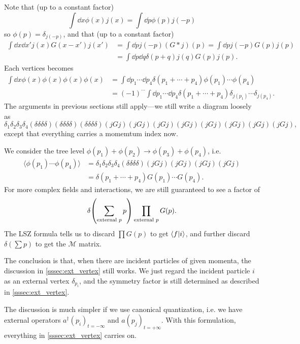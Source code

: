 \documentclass{article}
\begin{document}
Note that (up to a constant factor)
\[ \int \dd{x} \phi(x) j(x) = \int \dd{p} \phi(p) j(-p) \]
so $\phi(p) = \delta_{j(-p)}$, and that (up to a constant factor)
\begin{align*}
    \int \dd{x} \dd{x'} j(x) G(x-x') j(x') &= \int \dd{p} j(-p) (G*j)(p) = \int \dd{p} j(-p) G(p) j(p) \\
    &= \int \dd{p} \dd{q} \delta(p+q) j(q) G(p) j(p).
\end{align*}
Each vertices becomes
\begin{align*}
    \int \dd{x} \phi(x) \phi(x) \phi(x) \phi(x) &= \int \dd{p_1} \cdots \dd{p_4} \delta(p_1 + \cdots + p_4) \phi(p_1) \cdots \phi(p_4) \\
    &= (-1)^{\cdots} \int \dd{p_1} \cdots \dd{p_4} \delta(p_1 + \cdots + p_4) \delta_{j(p_1)} \cdots \delta_{j(p_4)}.
\end{align*}
The arguments in previous sections still apply---we still write a diagram loosely as
\[ \delta_1\delta_2\delta_3\delta_4(\delta\delta\delta\delta)(\delta\delta\delta\delta)(\delta\delta\delta\delta)(jGj)(jGj)(jGj)(jGj)(jGj)(jGj)(jGj)(jGj), \]
except that everything carries a momemtum index now.
\par
We consider the tree level $\phi(p_1)+\phi(p_2) \rightarrow \phi(p_3)+\phi(p_4)$, i.e.
\begin{align*}
    \langle \phi(p_1) \cdots \phi(p_4) \rangle &= \delta_1\delta_2\delta_3\delta_4(\delta\delta\delta\delta)(jGj)(jGj)(jGj)(jGj) \\
    &= \delta(p_1 + \cdots + p_4) G(p_1) \cdots G(p_4).
\end{align*}
For more complex fields and interactions, we are still guaranteed to see a factor of
\begin{equation}
    \delta\qty(\sum_{\text{external } p} p) \prod_{\text{external } p} G(p). \label{eq:amp_factor}
\end{equation}
The LSZ formula tells us to discard $\prod G(p)$ to get $\bra{f}\ket{i}$, and further discard $\delta(\sum p)$ to get the $\mathcal{M}$ matrix.

\par
The conclusion is that, when there are incident particles of given momenta, the discussion in \cref{sssec:ext_vertex} still works.
We just regard the incident particle $i$ as an external vertex $\delta_{p_i}$, and the symmetry factor is still determined as described in \cref{sssec:ext_vertex}.
\par
The discussion is much simpler if we use canonical quantization, i.e. we have external operators $a^\dagger(p_i)_{t=-\infty}$ and $a(p_j)_{t=+\infty}$.
With this formulation, everything in \cref{sssec:ext_vertex} carries on.
\end{document}

